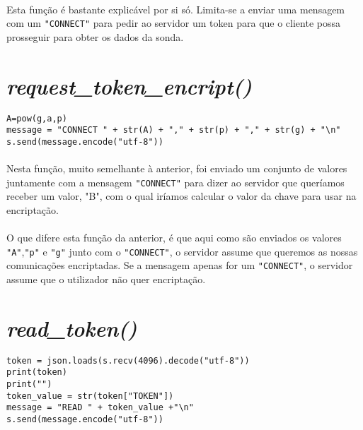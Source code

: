 \documentclass[a4paper]{report}
\begin{document}
\paragraph{}Esta função é bastante explicável por si só. Limita-se a enviar uma mensagem com um \texttt{"CONNECT"} para pedir ao servidor um token para que o cliente possa prosseguir para obter os dados da sonda.

\newpage

\section{\textit{request\_token\_encript()}}
\begin{lstlisting}
A=pow(g,a,p)
message = "CONNECT " + str(A) + "," + str(p) + "," + str(g) + "\n"
s.send(message.encode("utf-8"))
\end{lstlisting}
\paragraph{}Nesta função, muito semelhante à anterior, foi enviado um conjunto de valores juntamente com a mensagem \texttt{"CONNECT"} para dizer ao servidor que queríamos receber um valor, "B", com o qual iríamos calcular o valor da chave para usar na encriptação.

\paragraph{}O que difere esta função da anterior, é que aqui como são enviados os valores \texttt{"A"},\texttt{"p"} e \texttt{"g"} junto com o \texttt{"CONNECT"}, o servidor assume que queremos as nossas comunicações encriptadas. Se a mensagem apenas for um \texttt{"CONNECT"}, o servidor assume que o utilizador não quer encriptação.

\newpage

\section{\textit{read\_token()}}
\begin{lstlisting}
token = json.loads(s.recv(4096).decode("utf-8"))
print(token)
print("")
token_value = str(token["TOKEN"])
message = "READ " + token_value +"\n"
s.send(message.encode("utf-8"))
\end{lstlisting}
\end{document}
